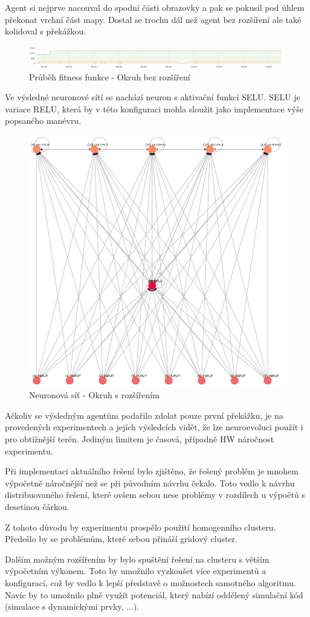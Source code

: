 Agent si nejprve nacouval do spodní části obrazovky a pak se pokusil pod úhlem překonat vrchní část mapy. Dostal se trochu dál než agent bez rozšíření ale také kolidoval s překážkou.
\begin{figure}[H]
	\centering
	\includegraphics[width=0.5\linewidth]{solutions/Iadvanced/advancedGraph}
	\caption{Průběh fitness funkce - Okruh bez rozšíření}
	\label{fig:advancedgraph}
\end{figure}
Ve výsledné neuronové sítí se nachází neuron s aktivační funkcí SELU. SELU je variace RELU, která by v této konfiguraci mohla sloužit jako implementace výše popsaného manévru.
\begin{figure}[H]
	\centering
	\includegraphics[width=0.5\linewidth]{solutions/Iadvanced/advanced}
	\caption{Neuronová síť - Okruh s rozšířením}
	\label{fig:advanced}
\end{figure}

Ačkoliv se výsledným agentům podařilo zdolat pouze první překážku, je na provedených experimentech a jejích výsledcích vidět, že lze neuroevoluci použít i pro obtížnější terén. Jediným limitem je časová, případně HW náročnost experimentu.

Při implementaci aktuálního řešení bylo zjištěno, že řešený problém je mnohem výpočetně náročnější než se při původním návrhu čekalo. Toto vedlo k návrhu distribuovaného řešení, které ovšem sebou nese problémy v rozdílech u výpočtů s desetinou čárkou.

Z tohoto důvodu by experimentu prospělo použití homogenního clusteru. Předešlo by se problémům, které sebou přináší gridový cluster.

Dalším možným rozšířením by bylo spuštění řešení na clusteru s větším výpočetním výkonem. Toto by umožnilo vyzkoušet více experimentů a konfigurací, což by vedlo k lepší představě o  možnostech samotného algoritmu. Navíc by to umožnilo plně využít potenciál, který nabízí oddělený simulační kód (simulace s dynamickými prvky, ...). 

